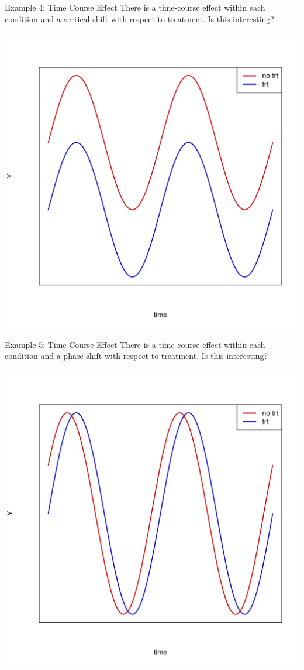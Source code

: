 \documentclass[xcolor=x11names,compress]{beamer}\usepackage[]{graphicx}\usepackage[]{color}
\newenvironment{knitrout}{}{} %
\begin{document}
\begin{frame}{Example 4: Time Course Effect}
   There is a time-course effect within each condition and a vertical shift with respect to treatment.
   Is this interesting? 
\begin{knitrout}\tiny
{}\color{fgcolor}

{\centering \includegraphics[width=.6\linewidth]{figure/beamer-unnamed-chunk-98-1} 

}



\end{knitrout}
\end{frame}
\begin{frame}{Example 5: Time Course Effect}
   There is a time-course effect within each condition and a phase shift with respect to treatment.
   Is this interesting? 
\begin{knitrout}\tiny
{}\color{fgcolor}

{\centering \includegraphics[width=.6\linewidth]{figure/beamer-unnamed-chunk-99-1} 

}



\end{knitrout}
\end{frame}
\end{document}
